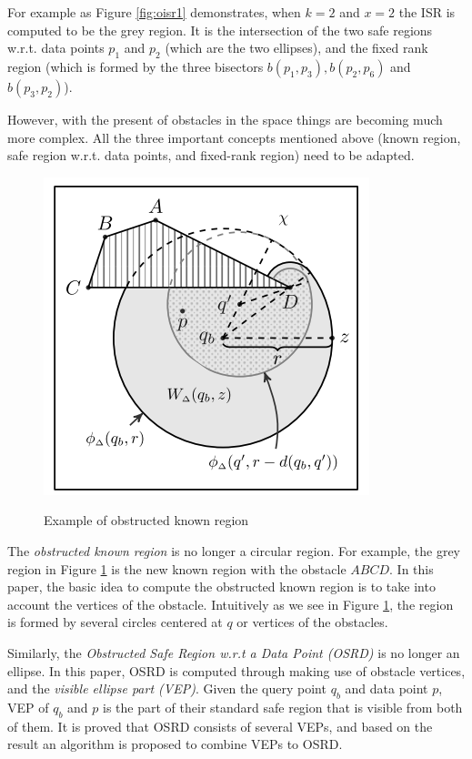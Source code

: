 \documentclass[paper=a4, fontsize=18pt]{article} %
\numberwithin{equation}{section} %
\numberwithin{figure}{section} %
\numberwithin{table}{section} %
\begin{document}
For example as Figure \ref{fig:oisr1} demonstrates, when $k = 2$ and $x = 2$ the ISR is computed to be the grey region. It is the intersection of the two safe regions w.r.t. data points $p_1$ and $p_2$ (which are the two ellipses), and the fixed rank region (which is formed by the three bisectors $b(p_1,p_3), b(p_2, p_6)$ and $b(p_3, p_2)$).

However, with the present of obstacles in the space things are becoming much more complex. All the three important concepts mentioned above (known region, safe region w.r.t. data points, and fixed-rank region) need to be adapted.

\begin{figure}[h]
  \centering
  \includegraphics[width=.5\linewidth]{8_8_oisr2.png}\\
  \caption{Example of obstructed known region}\label{fig:oisr2}
\end{figure}

The \emph{obstructed known region} is no longer a circular region. For example, the grey region in Figure \ref{fig:oisr2} is the new known region with the obstacle $ABCD$. In this paper, the basic idea to compute the obstructed known region is to take into account the vertices of the obstacle. Intuitively as we see in Figure \ref{fig:oisr2}, the region is formed by several circles centered at $q$ or vertices of the obstacles.

Similarly, the \emph{Obstructed Safe Region w.r.t a Data Point (OSRD)} is no longer an ellipse. In this paper, OSRD is computed through making use of obstacle vertices, and the \emph{visible ellipse part (VEP)}. Given the query point $q_b$ and data point $p$, VEP of $q_b$ and $p$ is the part of their standard safe region that is visible from both of them. It is proved that OSRD consists of several VEPs, and based on the result an algorithm is proposed to combine VEPs to OSRD.
\end{document}
